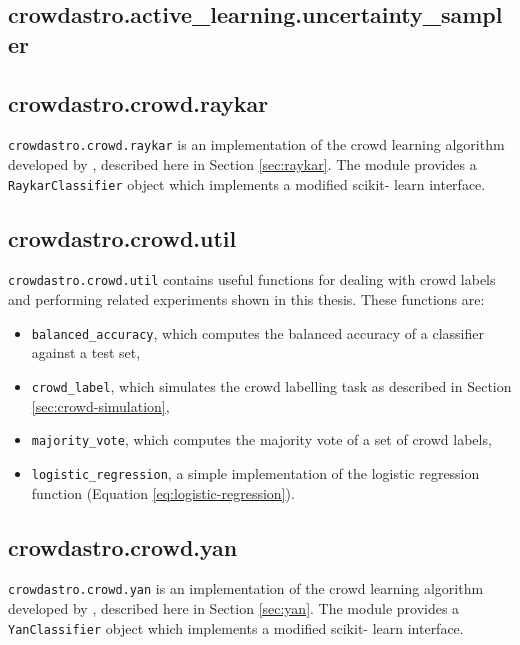     \subsection{crowdastro.active\_learning.uncertainty\_sampler}
        \label{sec:crowdastro-uncertainty-sampler}

    \subsection{crowdastro.crowd.raykar}
        \label{sec:crowdastro-raykar}

        \texttt{crowdastro.crowd.raykar} is an implementation of the crowd
        learning algorithm developed by \citet{raykar10}, described here in
        Section \ref{sec:raykar}. The module provides a
        \texttt{RaykarClassifier} object which implements a modified scikit-%
            learn interface.

    \subsection{crowdastro.crowd.util}
        \label{sec:crowdastro-util}

        \texttt{crowdastro.crowd.util} contains useful functions for dealing
        with crowd labels and performing related experiments shown in this
        thesis. These functions are:
        \begin{itemize}
            \item \texttt{balanced\_accuracy}, which computes the balanced
                accuracy of a classifier against a test set,
            \item \texttt{crowd\_label}, which simulates the crowd labelling
                task as described in Section \ref{sec:crowd-simulation},
            \item \texttt{majority\_vote}, which computes the majority vote of
                a set of crowd labels,
            \item \texttt{logistic\_regression}, a simple implementation of the
                logistic regression function (Equation
                \ref{eq:logistic-regression}).
        \end{itemize}

    \subsection{crowdastro.crowd.yan}
        \label{sec:crowdastro-yan}

        \texttt{crowdastro.crowd.yan} is an implementation of the crowd
        learning algorithm developed by \citet{yan10}, described here in
        Section \ref{sec:yan}. The module provides a
        \texttt{YanClassifier} object which implements a modified scikit-%
            learn interface.
